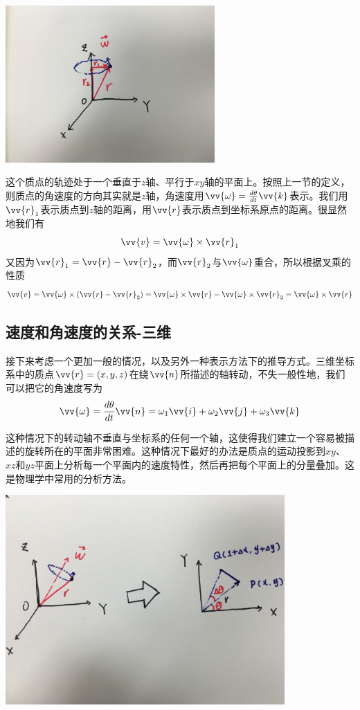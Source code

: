 \documentclass[11pt]{article}
\begin{document}
\begin{center}
\includegraphics[width=0.6\textwidth]{images/IMG_2299.jpg}
\end{center}

这个质点的轨迹处于一个垂直于$z$轴、平行于$xy$轴的平面上。按照上一节的定义，则质点的角速度的方向其实就是$z$轴，角速度用$\vv{\omega} = \frac{d\theta}{dt}\vv{k}$表示。我们用$\vv{r}_1$表示质点到$z$轴的距离，用$\vv{r}$表示质点到坐标系原点的距离。很显然地我们有
$$
\vv{v} = \vv{\omega} \times \vv{r}_1
$$
又因为$\vv{r}_1 = \vv{r} - \vv{r}_2$，而$\vv{r}_2$与$\vv{\omega}$重合，所以根据叉乘的性质
$$
\vv{v} = \vv{\omega} \times (\vv{r} - \vv{r}_2) = \vv{\omega} \times \vv{r} - \vv{\omega} \times \vv{r}_2 = \vv{\omega} \times \vv{r}
$$
\subsection{速度和角速度的关系-三维}\label{sec:velandangular3d}
接下来考虑一个更加一般的情况，以及另外一种表示方法下的推导方式。三维坐标系中的质点$\vv{r} = (x,y,z)$在绕$\vv{n}$所描述的轴转动，不失一般性地，我们可以把它的角速度写为
\begin{equation}\label{eqn:omegadef}
\vv{\omega} = \frac{d\theta}{dt}\vv{n} = \omega_1\vv{i}+\omega_2\vv{j}+\omega_3\vv{k}
\end{equation}

这种情况下的转动轴不垂直与坐标系的任何一个轴，这使得我们建立一个容易被描述的旋转所在的平面非常困难。这种情况下最好的办法是质点的运动投影到$xy$、$xz$和$yz$平面上分析每一个平面内的速度特性，然后再把每个平面上的分量叠加。这是物理学中常用的分析方法。

\begin{center}
\includegraphics[width=0.8\textwidth]{images/IMG_2300.jpg}
\end{center}
\end{document}
